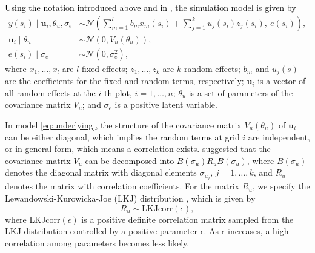 \documentclass[a4paper]{article} 	%
\newcommand{\N}{\mathcal{N}}
\newcommand{\revision}[1]{\textcolor{black}{#1}}
\begin{document}
\revision{Using the notation introduced above and in \textcite{Cao2022Bayesian}}, the \revision{simulation} model is \revision{given by} 
\begin{equation}\label{eq:underlying}
	\begin{split}
		y(s_i)\mid \bm{u}_i,\theta_u,\sigma_e &\sim \N\left( \sum_{m=1}^{l}b_m x_m(s_i) + \sum_{j=1}^{k}u_j(s_i)z_j(s_i),~e(s_i)\right), \\
		\bm{u}_i \mid \theta_u &\sim \N(0,V_u(\theta_u)), \\
		e(s_i) \mid \sigma_e &\sim \N(0,\sigma_e^2), 
	\end{split}
\end{equation}
where $x_1,\ldots, x_l$ are $l$ fixed effects; $z_1,\ldots, z_k$ are $k$ random effects; $b_m$ and $u_j(s)$ are the coefficients for the fixed and random terms, respectively; $\bm{u}_i$ is a vector of all random effects at \revision{the $i$-th plot,} %
$i=1,\ldots,n$; $\theta_u$ is a set of parameters of the covariance matrix $V_u$; and $\sigma_e$ is a positive latent variable. 
	

In model \eqref{eq:underlying}, the structure of the covariance matrix $V_u(\theta_u)$ of $\bm{u}_i$ can be either diagonal, which implies the \revision{random terms} at grid $i$ are independent, or in general form, which means a correlation exists. \textcite{McElreath2015Statistical} suggested that the covariance matrix \revision{$V_u$} can be \revision{decomposed into $B(\sigma_u)R_uB(\sigma_u)$}, where $B(\sigma_u)$ denotes the diagonal matrix with diagonal elements $\sigma_{u_j}$, $j=1,\ldots,k$, and $R_u$ denotes the matrix with correlation coefficients. For the matrix $R_u$, we specify the Lewandowski-Kurowicka-Joe (LKJ) distribution \parencite{Lewandowski2009Generating}, which is given by
\begin{equation}\label{eq:RPrior}
    R_u \sim \text{LKJcorr}(\epsilon),
\end{equation}
where $\text{LKJcorr}(\epsilon)$ is a positive definite correlation matrix sampled from the LKJ distribution controlled by a positive parameter $\epsilon$. As $\epsilon$ increases, a high correlation among parameters becomes less likely. 
\end{document}
